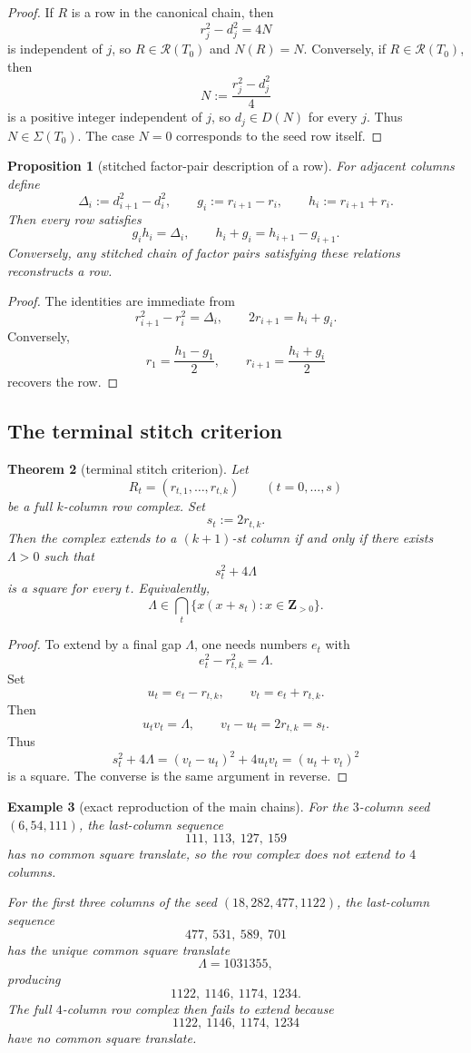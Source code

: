 \documentclass[11pt]{article}
\theoremstyle{plainbreak}
\newtheorem{theorem}{Theorem}[section]
\newtheorem{proposition}[theorem]{Proposition}
\theoremstyle{defbreak}
\newtheorem{example}[theorem]{Example}
\newcommand{\Dset}{D}
\newcommand{\Z}{\mathbf{Z}}
\begin{document}
\begin{proof}
If $R$ is a row in the canonical chain, then
\[
r_j^2-d_j^2=4N
\]
is independent of $j$, so $R\in \mathcal R(T_0)$ and $N(R)=N$.
Conversely, if $R\in \mathcal R(T_0)$, then
\[
N:=\frac{r_j^2-d_j^2}{4}
\]
is a positive integer independent of $j$, so $d_j\in \Dset(N)$ for every $j$. Thus $N\in \Sigma(T_0)$. The case $N=0$ corresponds to the seed row itself.
\end{proof}

\begin{proposition}[stitched factor-pair description of a row]
For adjacent columns define
\[
\Delta_i:=d_{i+1}^2-d_i^2,\qquad
g_i:=r_{i+1}-r_i,\qquad
h_i:=r_{i+1}+r_i.
\]
Then every row satisfies
\[
g_i h_i=\Delta_i,
\qquad
h_i+g_i=h_{i+1}-g_{i+1}.
\]
Conversely, any stitched chain of factor pairs satisfying these relations reconstructs a row.
\end{proposition}

\begin{proof}
The identities are immediate from
\[
r_{i+1}^2-r_i^2=\Delta_i,
\qquad
2r_{i+1}=h_i+g_i.
\]
Conversely,
\[
r_1=\frac{h_1-g_1}{2},
\qquad
r_{i+1}=\frac{h_i+g_i}{2}
\]
recovers the row.
\end{proof}

\subsection{The terminal stitch criterion}

\begin{theorem}[terminal stitch criterion]
Let
\[
R_t=(r_{t,1},\dots,r_{t,k})
\qquad (t=0,\dots,s)
\]
be a full $k$-column row complex. Set
\[
s_t:=2r_{t,k}.
\]
Then the complex extends to a $(k+1)$-st column if and only if there exists $\Lambda>0$ such that
\[
s_t^2+4\Lambda
\]
is a square for every $t$.  Equivalently,
\[
\Lambda\in \bigcap_t \{x(x+s_t):x\in \Z_{>0}\}.
\]
\end{theorem}

\begin{proof}
To extend by a final gap $\Lambda$, one needs numbers $e_t$ with
\[
e_t^2-r_{t,k}^2=\Lambda.
\]
Set
\[
u_t=e_t-r_{t,k},\qquad v_t=e_t+r_{t,k}.
\]
Then
\[
u_t v_t=\Lambda,\qquad v_t-u_t=2r_{t,k}=s_t.
\]
Thus
\[
s_t^2+4\Lambda=(v_t-u_t)^2+4u_tv_t=(u_t+v_t)^2
\]
is a square. The converse is the same argument in reverse.
\end{proof}

\begin{example}[exact reproduction of the main chains]
For the $3$-column seed $(6,54,111)$, the last-column sequence
\[
111,\ 113,\ 127,\ 159
\]
has no common square translate, so the row complex does not extend to $4$ columns.

For the first three columns of the seed $(18,282,477,1122)$, the last-column sequence
\[
477,\ 531,\ 589,\ 701
\]
has the unique common square translate
\[
\Lambda=1031355,
\]
producing
\[
1122,\ 1146,\ 1174,\ 1234.
\]
The full $4$-column row complex then fails to extend because
\[
1122,\ 1146,\ 1174,\ 1234
\]
have no common square translate.
\end{example}
\end{document}
